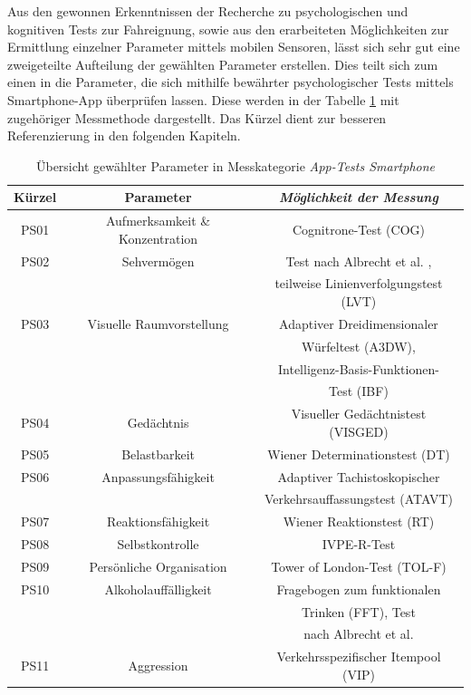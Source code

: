 Aus den gewonnen Erkenntnissen der Recherche zu psychologischen und kognitiven Tests zur Fahreignung, sowie aus den erarbeiteten Möglichkeiten zur Ermittlung einzelner Parameter mittels mobilen Sensoren, lässt sich sehr gut eine zweigeteilte Aufteilung der gewählten Parameter erstellen. Dies teilt sich zum einen in die Parameter, die sich mithilfe bewährter psychologischer Tests mittels Smartphone-App überprüfen lassen. Diese werden in der Tabelle \ref{tab:ps} mit zugehöriger Messmethode dargestellt. Das Kürzel dient zur besseren Referenzierung in den folgenden Kapiteln. 

\begin{table}[htbp]
	\caption{Übersicht gewählter Parameter in Messkategorie \textit{App-Tests Smartphone}}
	\begin{center}
		\begin{tabular}{c c c }
			\hline
			Kürzel& \textbf{Parameter} & \textbf{\textit{Möglichkeit der Messung}}\\
			\hline
			PS01 & Aufmerksamkeit \& Konzentration& Cognitrone-Test (COG)  \\
			PS02 & Sehvermögen& Test nach Albrecht et al. \cite{mobilesmarttracking}, \\
			&& teilweise Linienverfolgungstest (LVT) \\
			PS03 &Visuelle Raumvorstellung&Adaptiver Dreidimensionaler \\
			&&Würfeltest (A3DW), \\ 
			&&Intelligenz-Basis-Funktionen-\\
			&&Test (IBF) \\
			PS04 & Gedächtnis& Visueller Gedächtnistest (VISGED)\\
			PS05 & Belastbarkeit & Wiener Determinationstest (DT) \\
			PS06 & Anpassungsfähigkeit & Adaptiver Tachistoskopischer \\
			&&Verkehrsauffassungstest (ATAVT) \\
			PS07&Reaktionsfähigkeit&Wiener Reaktionstest (RT) \\
			PS08&Selbstkontrolle&IVPE-R-Test \\
			PS09&Persönliche Organisation&Tower of London-Test (TOL-F) \\
			PS10&Alkoholauffälligkeit&Fragebogen zum funktionalen \\
			&&Trinken (FFT), Test \\
			&&nach Albrecht et al. \cite{mobilesmarttracking} \\
			PS11&Aggression&Verkehrsspezifischer Itempool (VIP) \\
			
			\hline
		\end{tabular}
		\label{tab:ps}
	\end{center}
\end{table}

